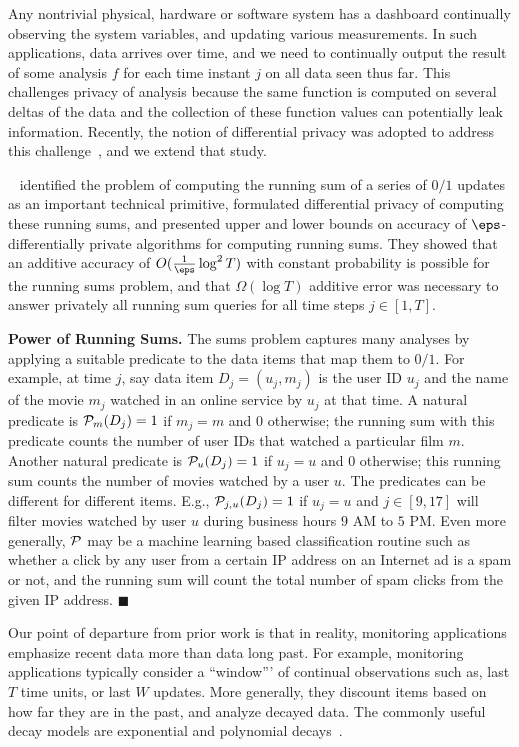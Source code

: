 Any nontrivial physical, hardware or software system has a dashboard continually observing the system variables, and updating various measurements.  In such applications, data arrives over time, and we need to continually output the result of some analysis $f$ 
for each time instant $j$ on all data seen thus far.  This challenges privacy of analysis because the same function is computed on several deltas of the data and the collection of these function values can potentially leak information.
Recently, the notion of differential privacy was adopted to address this challenge~\cite{dwork-continual,chan2010private}, and we extend that study.


~\cite{dwork-continual,chan2010private} identified the problem of computing the running sum of a series of $0/1$ updates as an important technical primitive, formulated differential privacy of computing these running sums, and presented upper and lower bounds on accuracy of $\eps$-differentially private algorithms for computing running sums. They showed that an additive accuracy of $O(\frac{1}{\eps} \log^{2}  T)$ with constant probability is possible for the running sums problem, and that $\Omega(\log T)$ additive error was necessary to answer privately all running sum queries for all time steps $j \in [1, T]$. 

\medskip
\noindent
{\bf Power of Running Sums.} The sums problem 
captures many analyses by  applying a suitable predicate  to the data items that map them to $0/1$. 
For example, at time $j$, say data item $D_j=(u_j,m_j)$ is the user ID $u_j$ and the name of the movie $m_j$ watched in an online service by $u_j$ at that time. A natural predicate is ${\cal P}_m(D_j)=1$ if $m_j=m$ and $0$ otherwise; the running sum with this predicate counts the number of user IDs that watched a particular film $m$. Another natural predicate is 
${\cal P}_u(D_j)=1$ if $u_j=u$ and $0$ otherwise; this running sum counts the number of movies watched by a user $u$.  The predicates can be different for different items. E.g., 
${\cal P}_{j,u}(D_j)=1$ if $u_j=u$ and $j \in [9,17]$ will filter movies watched by user $u$ during business hours $9$ AM to $5$ PM.  Even more generally, ${\cal P}$ may be 
a machine learning based classification routine such as whether a
click by any user from a certain IP address on an Internet ad is a
spam or not, and the running sum will count the total number of spam clicks from the given IP address. \hfill$\blacksquare$

\medskip
Our point of departure from prior work is that in reality, monitoring applications emphasize recent data more than data long past.  For example, monitoring applications typically consider a  ``window''' of continual observations such as, last $T$ time units, or last $W$ updates.  More generally, they discount items based on how far they are in the past, and analyze decayed data.
The commonly useful decay models  are exponential and polynomial 
decays~\cite{datar2002maintaining,cohen2003maintaining}. 

